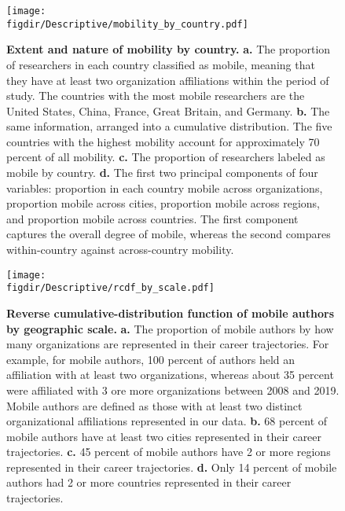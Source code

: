\documentclass[12pt]{article} %
\def\figdir{../Figs}
\begin{document}
%
%
\begin{figure}[p!]
    \centering
    \label{fig:supp:pubs_over_time}
    \texttt{[image: \\figdir/Descriptive/mobility\_by\_country.pdf]}
    \caption{
        \textbf{Extent and nature of mobility by country.}
        \textbf{a.}
        The proportion of researchers in each country classified as mobile, meaning that they have at least two organization affiliations within the period of study. 
        The countries with the most mobile researchers are the United States, China, France, Great Britain, and Germany. 
        \textbf{b.}
        The same information, arranged into a cumulative distribution.
        The five countries with the highest mobility account for approximately 70 percent of all mobility. 
        \textbf{c.} The proportion of researchers labeled as mobile by country.
        \textbf{d.} The first two principal components of four variables: proportion in each country mobile across organizations, proportion mobile across cities, proportion mobile across regions, and proportion mobile across countries. 
        The first component captures the overall degree of mobile, whereas the second compares within-country against across-country mobility.         
    }
\end{figure}


\newpage
%
%
\begin{figure}[p!]
    \centering
    \label{fig:supp:rcdf_by_scale}
    \texttt{[image: \\figdir/Descriptive/rcdf\_by\_scale.pdf]}
    \caption{
        \textbf{Reverse cumulative-distribution function of mobile authors by geographic scale.}
        \textbf{a.}
        The proportion of mobile authors by how many organizations are represented in their career trajectories. 
        For example, for mobile authors, 100 percent of authors held an affiliation with at least two organizations, whereas about 35 percent were affiliated with 3 ore more organizations between 2008 and 2019.
        Mobile authors are defined as those with at least two distinct organizational affiliations represented in our data. 
        \textbf{b.} 68 percent of mobile authors have at least two cities represented in their career trajectories.
        \textbf{c.} 45 percent of mobile authors have 2 or more regions represented in their career trajectories.
        \textbf{d.} Only 14 percent of mobile authors had 2 or more countries represented in their career trajectories. 
    }
\end{figure}
\end{document}
